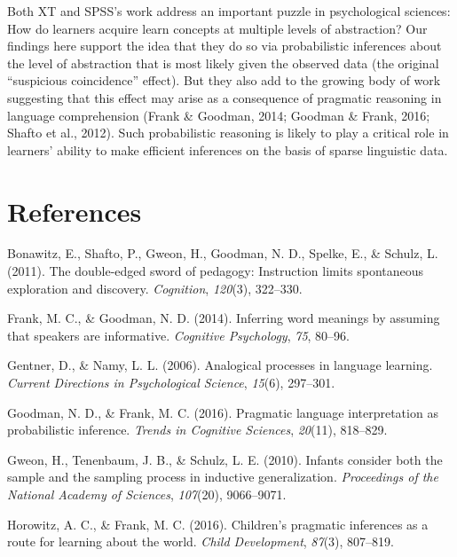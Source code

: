 \documentclass[english,floatsintext,man]{apa6}
\theoremstyle{definition}
\theoremstyle{definition}
\theoremstyle{definition}
\theoremstyle{remark}
\begin{document}
Both XT and SPSS's work address an important puzzle in psychological
sciences: How do learners acquire learn concepts at multiple levels of
abstraction? Our findings here support the idea that they do so via
probabilistic inferences about the level of abstraction that is most
likely given the observed data (the original \enquote{suspicious
coincidence} effect). But they also add to the growing body of work
suggesting that this effect may arise as a consequence of pragmatic
reasoning in language comprehension (Frank \& Goodman, 2014; Goodman \&
Frank, 2016; Shafto et al., 2012). Such probabilistic reasoning is
likely to play a critical role in learners' ability to make efficient
inferences on the basis of sparse linguistic data.

\newpage

\section{References}\label{references}

\setlength{\parindent}{-0.5in} \setlength{\leftskip}{0.5in}

\hypertarget{refs}{}
\hypertarget{ref-bonawitz2011}{}
Bonawitz, E., Shafto, P., Gweon, H., Goodman, N. D., Spelke, E., \&
Schulz, L. (2011). The double-edged sword of pedagogy: Instruction
limits spontaneous exploration and discovery. \emph{Cognition},
\emph{120}(3), 322--330.

\hypertarget{ref-frank2014}{}
Frank, M. C., \& Goodman, N. D. (2014). Inferring word meanings by
assuming that speakers are informative. \emph{Cognitive Psychology},
\emph{75}, 80--96.

\hypertarget{ref-gentner2006}{}
Gentner, D., \& Namy, L. L. (2006). Analogical processes in language
learning. \emph{Current Directions in Psychological Science},
\emph{15}(6), 297--301.

\hypertarget{ref-goodman2016}{}
Goodman, N. D., \& Frank, M. C. (2016). Pragmatic language
interpretation as probabilistic inference. \emph{Trends in Cognitive
Sciences}, \emph{20}(11), 818--829.

\hypertarget{ref-gweon2010}{}
Gweon, H., Tenenbaum, J. B., \& Schulz, L. E. (2010). Infants consider
both the sample and the sampling process in inductive generalization.
\emph{Proceedings of the National Academy of Sciences}, \emph{107}(20),
9066--9071.

\hypertarget{ref-horowitz2016}{}
Horowitz, A. C., \& Frank, M. C. (2016). Children's pragmatic inferences
as a route for learning about the world. \emph{Child Development},
\emph{87}(3), 807--819.
\end{document}
